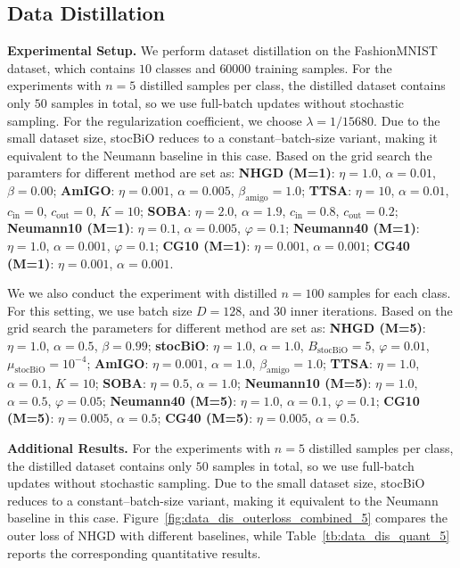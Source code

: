 \documentclass[11 pt]{article}
\begin{document}
\subsection{Data Distillation}\label{app:experiments_datadis}

\textbf{Experimental Setup.}
We perform dataset distillation on the FashionMNIST dataset, which contains $10$ classes
and $60000$ training samples. 
For the experiments with $n=5$ distilled samples per class, the distilled dataset contains only $50$ samples in total, so we use full-batch updates without stochastic sampling. For the regularization coefficient, we choose $\lambda=1/15680$. Due to the small dataset size, stocBiO reduces to a constant–batch-size variant, making it equivalent to the Neumann baseline in this case. 
Based on the grid search the paramters
for different method are set as: \textbf{NHGD (M=1)}: $\eta = 1.0$, $\alpha = 0.01$, $\beta = 0.00$; 
\textbf{AmIGO}: $\eta = 0.001$, $\alpha = 0.005$, $\beta_\text{amigo} = 1.0$; 
\textbf{TTSA}: $\eta = 10$, $\alpha = 0.01$, $c_\text{in}=0$, $c_\text{out}=0$, $K=10$; 
\textbf{SOBA}: $\eta = 2.0$, $\alpha = 1.9$, $c_\text{in}=0.8$, $c_\text{out}=0.2$; 
 \textbf{Neumann10 (M=1)}: $\eta = 0.1$, $\alpha = 0.005$, $\varphi = 0.1$;  
\textbf{Neumann40 (M=1)}: $\eta = 1.0$, $\alpha = 0.001$, $\varphi = 0.1$;  
\textbf{CG10 (M=1)}: $\eta = 0.001$, $\alpha = 0.001$;  
\textbf{CG40 (M=1)}: $\eta = 0.001$, $\alpha = 0.001$.


We we also conduct the experiment with distilled $n=100$ samples for each class. For this setting, we use batch size $D=128$, and 30 inner iterations.
Based on the grid search the parameters
for different method are set as: \textbf{NHGD (M=5)}: $\eta = 1.0$, $\alpha = 0.5$, $\beta = 0.99$; 
\textbf{stocBiO}: $\eta = 1.0$, $\alpha = 1.0$, $B_\text{stocBiO}=5$, $\varphi=0.01$, $\mu_\text{stocBiO}=10^{-4}$; 
\textbf{AmIGO}: $\eta = 0.001$, $\alpha = 1.0$, $\beta_\text{amigo} = 1.0$; 
\textbf{TTSA}: $\eta = 1.0$, $\alpha = 0.1$, $K=10$; 
\textbf{SOBA}: $\eta = 0.5$, $\alpha = 1.0$; 
 \textbf{Neumann10 (M=5)}: $\eta = 1.0$, $\alpha = 0.5$, $\varphi = 0.05$;  
\textbf{Neumann40 (M=5)}: $\eta = 1.0$, $\alpha = 0.1$, $\varphi = 0.1$;  
\textbf{CG10 (M=5)}: $\eta = 0.005$, $\alpha = 0.5$;  
\textbf{CG40 (M=5)}: $\eta = 0.005$, $\alpha = 0.5$.  



\textbf{Additional Results.} 
For the experiments with $n=5$ distilled samples per class, the distilled dataset contains only $50$ samples in total, so we use full-batch updates without stochastic sampling. Due to the small dataset size, stocBiO reduces to a constant–batch-size variant, making it equivalent to the Neumann baseline in this case.
Figure~\ref{fig:data_dis_outerloss_combined_5} compares the outer loss of NHGD with different baselines, while Table~\ref{tb:data_dis_quant_5} reports the corresponding quantitative results.
\end{document}
